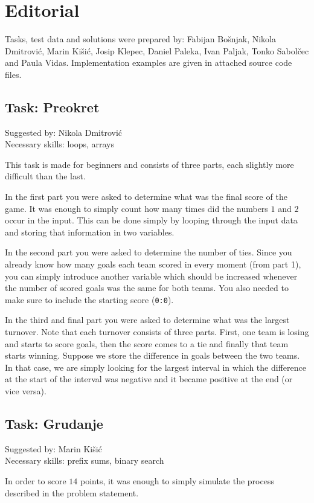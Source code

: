 \documentclass[a4paper]{article}
\begin{document}
\section*{Editorial}
Tasks, test data and solutions were prepared by: Fabijan Bošnjak, Nikola
Dmitrović, Marin Kišić, Josip Klepec, Daniel Paleka, Ivan Paljak, Tonko
Sabolčec and Paula Vidas. Implementation examples are given
in attached source code files.

\subsection*{Task: Preokret}
\textsf{Suggested by: Nikola Dmitrović}\\
\textsf{Necessary skills: loops, arrays}

This task is made for beginners and consists of three parts, each slightly
more difficult than the last.

In the first part you were asked to determine what was the final score of the
game. It was enough to simply count how many times did the numbers $1$ and $2$
occur in the input. This can be done simply by looping through the input data
and storing that information in two variables.

In the second part you were asked to determine the number of ties. Since you
already know how many goals each team scored in every moment (from part 1),
you can simply introduce another variable which should be increased whenever
the number of scored goals was the same for both teams. You also needed to
make sure to include the starting score (\texttt{0:0}).

In the third and final part you were asked to determine what was the largest
turnover. Note that each turnover consists of three parts. First, one team is
losing and starts to score goals, then the score comes to a tie and finally that
team starts winning. Suppose we store the difference in goals between the two
teams. In that case, we are simply looking for the largest interval in which
the difference at the start of the interval was negative and it became positive
at the end (or vice versa).

\subsection*{Task: Grudanje}
\textsf{Suggested by: Marin Kišić}\\
\textsf{Necessary skills: prefix sums, binary search}

In order to score $14$ points, it was enough to simply simulate the process
described in the problem statement.
\end{document}
